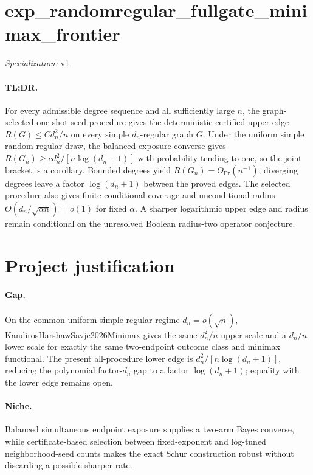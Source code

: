 \documentclass{article}
\begin{document}
\sloppy

\section*{exp\_\allowbreak{}randomregular\_\allowbreak{}fullgate\_\allowbreak{}minimax\_\allowbreak{}frontier}

\noindent\textit{Specialization:} v1\par

\paragraph{TL;DR.} For every admissible degree sequence and all sufficiently large \(n\), the graph-selected one-shot seed procedure gives the deterministic certified upper edge \(R(G)\le C d_n^2/n\) on every simple \(d_n\)-regular graph \(G\). Under the uniform simple random-regular draw, the balanced-exposure converse gives \(R(G_n)\ge c d_n^2/[n\log(d_n+1)]\) with probability tending to one, so the joint bracket is a corollary. Bounded degrees yield \(R(G_n)=\Theta_{\Pr}(n^{-1})\); diverging degrees leave a factor \(\log(d_n+1)\) between the proved edges. The selected procedure also gives finite conditional coverage and unconditional radius \(O(d_n/\sqrt{\alpha n})=o(1)\) for fixed \(\alpha\). A sharper logarithmic upper edge and radius remain conditional on the unresolved Boolean radius-two operator conjecture.

\section{Project justification}

\paragraph{Gap.} On the common uniform-simple-regular regime \(d_n=o(\sqrt n)\), KandirosHarshawSavje2026Minimax gives the same \(d_n^2/n\) upper scale and a \(d_n/n\) lower scale for exactly the same two-endpoint outcome class and minimax functional. The present all-procedure lower edge is \(d_n^2/[n\log(d_n+1)]\), reducing the polynomial factor-\(d_n\) gap to a factor \(\log(d_n+1)\); equality with the lower edge remains open.

\paragraph{Niche.} Balanced simultaneous endpoint exposure supplies a two-arm Bayes converse, while certificate-based selection between fixed-exponent and log-tuned neighborhood-seed counts makes the exact Schur construction robust without discarding a possible sharper rate.
\end{document}
